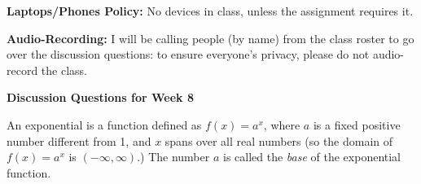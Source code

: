 \documentclass[12pt,dvipsnames]{article}
\begin{document}
{\bfseries{Laptops/Phones Policy:}}  No devices in class, unless the assignment requires it.

{\bfseries{Audio-Recording:}} I will be calling people (by name) from the class roster to go over the discussion questions: to ensure everyone's privacy, please do not audio-record the class.


\begin{center}

{\large{\bfseries{Discussion Questions for Week 8} }}
\end{center}

\begin{mdframed}[style=testframe]
	An exponential is a function defined as $\displaystyle f(x)=a^x$, where $a$ is a fixed positive number different from 1, and $x$ spans over all real numbers (so the domain of $\displaystyle f(x)=a^x$ is $\displaystyle (-\infty,\infty )$.) The number $a$ is called the {\emph{base}} of the exponential function.
\end{mdframed}
\end{document}
